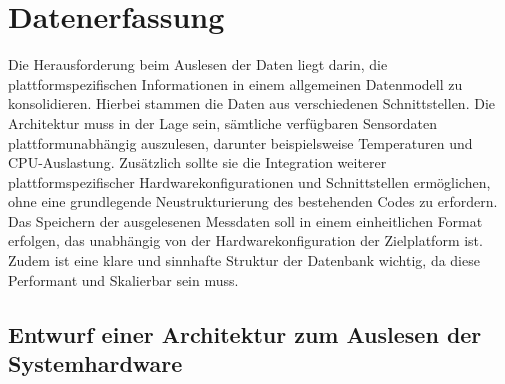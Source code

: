 \section{Datenerfassung}\label{sec:Datenerfassung}
Die Herausforderung beim Auslesen der Daten liegt darin, die plattformspezifischen Informationen in einem allgemeinen Datenmodell zu konsolidieren. Hierbei stammen die Daten aus verschiedenen Schnittstellen. Die Architektur muss in der Lage sein, sämtliche verfügbaren Sensordaten plattformunabhängig auszulesen, darunter beispielsweise Temperaturen und CPU-Auslastung. Zusätzlich sollte sie die Integration weiterer plattformspezifischer Hardwarekonfigurationen und Schnittstellen ermöglichen, ohne eine grundlegende Neustrukturierung des bestehenden Codes zu erfordern.\\
Das Speichern der ausgelesenen Messdaten soll in einem einheitlichen Format erfolgen, das unabhängig von der Hardwarekonfiguration der Zielplatform ist. Zudem ist eine klare und sinnhafte Struktur der Datenbank wichtig, da diese Performant und Skalierbar sein muss.   

\subsection{Entwurf einer Architektur zum Auslesen der Systemhardware}
 
